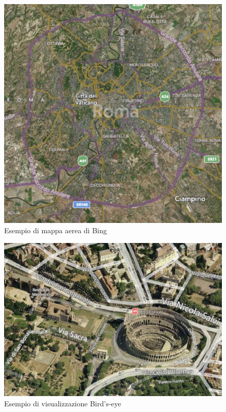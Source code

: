 \begin{figure}[ht]
	\centering
	\includegraphics[scale=0.4]{figure/BINGAerial.eps}
	\caption{Esempio di mappa aerea di Bing}\label{fig:BINGAerial}
\end{figure}

\begin{figure}[H]
	\centering
	\includegraphics[scale=0.5]{figure/BINGBirdseye.eps}
	\caption{Esempio di visualizzazione Bird's-eye}
\end{figure}

